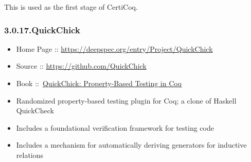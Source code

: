 \documentclass[12pt,twoside]{article}
\begin{document}
This is used as the first stage of CertiCoq.%

\subsubsection{3.0.17.\hspace*{0.5em}QuickChick}\label{sec-quickchick}%

\begin{itemize}%

\item{}
Home Page :: \href{https://deepspec.org/entry/Project/QuickChick}{{\ttfamily https://\hspace{0pt}deepspec.\hspace{0pt}org/\hspace{0pt}entry/\hspace{0pt}Project/\hspace{0pt}QuickChick}}%

\item{}
Source :: \href{https://github.com/QuickChick}{{\ttfamily https://\hspace{0pt}github.\hspace{0pt}com/\hspace{0pt}QuickChick}}%

\item{}
Book ::~\href{https://softwarefoundations.cis.upenn.edu/qc-current}{QuickChick: Property-Based Testing in Coq}%

\item{}
Randomized property-based testing plugin for Coq; a clone of Haskell QuickCheck%

\item{}
Includes a foundational verification framework for testing code%

\item{}
Includes a mechanism for automatically deriving generators for inductive relations%
\end{itemize}%
\end{document}
